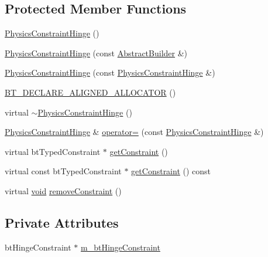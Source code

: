 \subsection*{Protected Member Functions}
\begin{DoxyCompactItemize}
\item 
\mbox{\hyperlink{classnjli_1_1_physics_constraint_hinge_a98b095bfe21e5fd303130f8991f39552}{Physics\+Constraint\+Hinge}} ()
\item 
\mbox{\hyperlink{classnjli_1_1_physics_constraint_hinge_a560929857ec13439f35c459bc326e583}{Physics\+Constraint\+Hinge}} (const \mbox{\hyperlink{classnjli_1_1_abstract_builder}{Abstract\+Builder}} \&)
\item 
\mbox{\hyperlink{classnjli_1_1_physics_constraint_hinge_a0487d3ff017819816839de83fa450ad3}{Physics\+Constraint\+Hinge}} (const \mbox{\hyperlink{classnjli_1_1_physics_constraint_hinge}{Physics\+Constraint\+Hinge}} \&)
\item 
\mbox{\hyperlink{classnjli_1_1_physics_constraint_hinge_a54cc154675629f9c1fefb2caa925cc57}{B\+T\+\_\+\+D\+E\+C\+L\+A\+R\+E\+\_\+\+A\+L\+I\+G\+N\+E\+D\+\_\+\+A\+L\+L\+O\+C\+A\+T\+OR}} ()
\item 
virtual \mbox{\hyperlink{classnjli_1_1_physics_constraint_hinge_a47b7e2f35e6062de7a813a0849686f65}{$\sim$\+Physics\+Constraint\+Hinge}} ()
\item 
\mbox{\hyperlink{classnjli_1_1_physics_constraint_hinge}{Physics\+Constraint\+Hinge}} \& \mbox{\hyperlink{classnjli_1_1_physics_constraint_hinge_af2dbf3661171c4725e57626d7ad7944b}{operator=}} (const \mbox{\hyperlink{classnjli_1_1_physics_constraint_hinge}{Physics\+Constraint\+Hinge}} \&)
\item 
virtual bt\+Typed\+Constraint $\ast$ \mbox{\hyperlink{classnjli_1_1_physics_constraint_hinge_a0e6fd626089d0df9061f58e05bf81cdc}{get\+Constraint}} ()
\item 
virtual const bt\+Typed\+Constraint $\ast$ \mbox{\hyperlink{classnjli_1_1_physics_constraint_hinge_abc19706f99699a8af8178058c8d80822}{get\+Constraint}} () const
\item 
virtual \mbox{\hyperlink{_thread_8h_af1e856da2e658414cb2456cb6f7ebc66}{void}} \mbox{\hyperlink{classnjli_1_1_physics_constraint_hinge_aad341621e3585f5f8c3c2b4d369be7e2}{remove\+Constraint}} ()
\end{DoxyCompactItemize}
\subsection*{Private Attributes}
\begin{DoxyCompactItemize}
\item 
bt\+Hinge\+Constraint $\ast$ \mbox{\hyperlink{classnjli_1_1_physics_constraint_hinge_aeb5449d17ea4a80fa37ac059e3fba661}{m\+\_\+bt\+Hinge\+Constraint}}
\end{DoxyCompactItemize}
